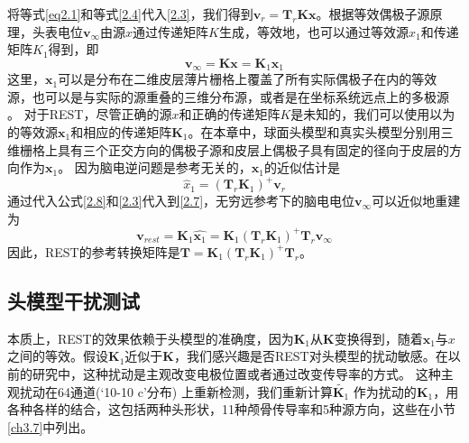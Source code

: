 将等式\eqref{eq2.1}和等式\eqref{2.4}代入\eqref{2.3}，我们得到$\mathbf{v}_r=\mathbf{T}_{r}\mathbf{Kx}$。根据等效偶极子源原理，头表电位$\mathbf{v}_{\infty}$由源$x$通过传递矩阵$K$生成，等效地，也可以通过等效源$x_1$和传递矩阵$K_1$得到，即
\begin{equation}\label{2.7}
\mathbf{v}_{\infty}=\mathbf{Kx}=\mathbf{K}_1\mathbf{x}_1
\end{equation}
这里，$\mathbf{x}_1$可以是分布在二维皮层薄片栅格上覆盖了所有实际偶极子在内的等效源，也可以是与实际的源重叠的三维分布源，或者是在坐标系统远点上的多极源 。 对于REST，尽管正确的源$x$和正确的传递矩阵$K$是未知的，我们可以使用以为的等效源$\mathbf{x}_1$和相应的传递矩阵$\mathbf{K}_1$。在本章中，球面头模型和真实头模型分别用三维栅格上具有三个正交方向的偶极子源和皮层上偶极子具有固定的径向于皮层的方向作为$\mathbf{x}_1$。 因为脑电逆问题是参考无关的，$\mathbf{x}_1$的近似估计是
\begin{equation}\label{2.8}
\hat{x}_1=(\mathbf{T}_{r}\mathbf{K}_1)^{+}\mathbf{v}_r
\end{equation}
通过代入公式\eqref{2.8}和\eqref{2.3}代入到\eqref{2.7}，无穷远参考下的脑电电位$\mathbf{v}_{\infty}$可以近似地重建为
\begin{equation}\label{2.9}
\mathbf{v}_{rest}=\mathbf{K}_1\hat{\mathbf{x}_1}=\mathbf{K}_1(\mathbf{T}_{r}\mathbf{K}_1)^{+}\mathbf{T}_r\mathbf{v}_{\infty}
\end{equation}
因此，REST的参考转换矩阵是$\mathbf{T}=\mathbf{K}_1(\mathbf{T}_{r}\mathbf{K}_1)^{+}\mathbf{T}_r$。
\subsection{头模型干扰测试}
本质上，REST的效果依赖于头模型的准确度，因为$\mathbf{K}_1$从$\mathbf{K}$变换得到，随着$\mathbf{x}_1$与$x$之间的等效。假设$\mathbf{K}_1$近似于$\mathbf{K}$，我们感兴趣是否REST对头模型的扰动敏感。在以前的研究中，这种扰动是主观改变电极位置或者通过改变传导率的方式。 这种主观扰动在64通道(‘10-10 c’分布) 上重新检测，我们重新计算$\tilde{\mathbf{K}_1}$ 作为扰动的$\mathbf{K}_1$，用各种各样的结合，这包括两种头形状，11种颅骨传导率和5种源方向，这些在小节\ref{ch3.7}中列出。

